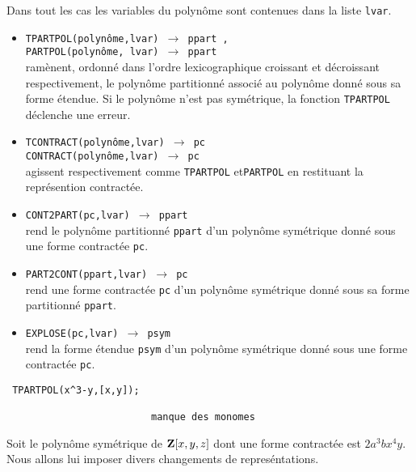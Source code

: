 Dans tout les cas les variables du polyn\^ome sont contenues dans la liste
{\tt lvar}.
\begin{itemize}
\item {\tt TPARTPOL(polyn\^ome,lvar) 
$\longrightarrow$ ppart ,\\
       PARTPOL(polyn\^ome, lvar) 
$\longrightarrow$ ppart}\\
 ram\`{e}nent, ordonn\'e dans l'ordre lexicographique croissant et
d\'ecroissant respectivement, le
polyn\^{o}me partitionn\'{e} associ\'{e} au polyn\^{o}me donn\'e sous sa forme
\'etendue. Si le polyn\^ome n'est pas sym\'etrique, la fonction
{\tt TPARTPOL} d\'eclenche une erreur.

\item {\tt TCONTRACT(polyn\^ome,lvar)
 $\longrightarrow$ pc}\\
 {\tt CONTRACT(polyn\^ome,lvar)
 $\longrightarrow$ pc}\\
agissent respectivement comme {\tt TPARTPOL} et{\tt PARTPOL} en restituant la repr\'esention contract\'ee.

\item  {\tt CONT2PART(pc,lvar) 
 $\longrightarrow$ ppart }\\
rend le polyn\^ome partitionn\'e {\tt ppart} d'un polyn\^ome sym\'etrique
donn\'e sous une forme contract\'ee {\tt pc}.

\item {\tt PART2CONT(ppart,lvar) 
 $\longrightarrow$ pc }\\
rend une forme contract\'ee {\tt pc} d'un polyn\^ome sym\'etrique
donn\'e sous sa forme partitionn\'e {\tt ppart}.

\item  {\tt EXPLOSE(pc,lvar) 
$\longrightarrow$ psym }\\
rend la forme \'etendue {\tt psym} d'un polyn\^ome sym\'etrique
donn\'e sous une forme contract\'ee {\tt pc}.

\end{itemize}
\small
\begin{verbatim}
 TPARTPOL(x^3-y,[x,y]);

                         manque des monomes
\end{verbatim}
Soit le  polyn\^ome sym\'etrique de ${\bf Z}[x,y,z]$ dont une forme 
contract\'ee est $2a^3bx^4y$. Nous allons lui imposer divers changements
de repres\'entations.

